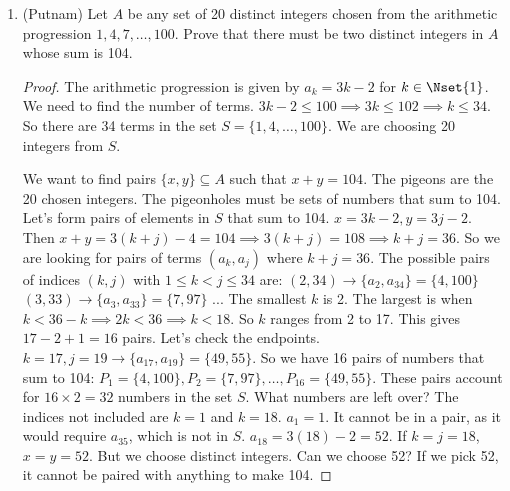 \begin{enumerate}
\begin{proof}
    Now we analyze this collision. Consider the sequence elements $a_j$ and $a_k$ with $j < k$.
    Case 1: $a_j < a_k$. Since $a_k$ comes after $a_j$ and is larger, we can form an increasing subsequence ending at $a_k$ by taking the longest increasing subsequence that ends at $a_j$ (which has length $i_j = i^*$) and appending $a_k$. The new length would be $i_j+1 = i^*+1$. But we know the longest increasing subsequence ending at $a_k$ has length $i_k=i^*$. This is a contradiction, as we have found a longer one.
    Case 2: $a_j > a_k$. Similarly, since $a_k$ comes after $a_j$ and is smaller, we can form a decreasing subsequence ending at $a_k$ by taking the longest decreasing subsequence ending at $a_j$ (of length $d_j=d^*$) and appending $a_k$. The new length is $d_j+1=d^*+1$. This contradicts the fact that the longest such sequence has length $d_k=d^*$.
    
    Since $a_j$ and $a_k$ are distinct, one of these two cases must hold. Both lead to a contradiction. Therefore, our initial assumption that no monotonic subsequence of length $n+1$ exists must be false.
    \end{proof}
    
    \item {} (Putnam) Let $A$ be any set of 20 distinct integers chosen from the arithmetic progression $1, 4, 7, \dots, 100$. Prove that there must be two distinct integers in $A$ whose sum is 104.
    \begin{proof}
    The arithmetic progression is given by $a_k = 3k-2$ for $k \in \Nset{1}$. We need to find the number of terms. $3k-2 \le 100 \implies 3k \le 102 \implies k \le 34$. So there are 34 terms in the set $S = \{1, 4, \dots, 100\}$. We are choosing 20 integers from $S$.

    We want to find pairs $\{x,y\} \subseteq A$ such that $x+y=104$. The pigeons are the 20 chosen integers. The pigeonholes must be sets of numbers that sum to 104.
    Let's form pairs of elements in $S$ that sum to 104.
    $x=3k-2, y=3j-2$. Then $x+y = 3(k+j)-4 = 104 \implies 3(k+j)=108 \implies k+j=36$.
    So we are looking for pairs of terms $(a_k, a_j)$ where $k+j=36$.
    The possible pairs of indices $(k,j)$ with $1 \le k < j \le 34$ are:
    $(2,34) \to \{a_2, a_{34}\} = \{4, 100\}$
    $(3,33) \to \{a_3, a_{33}\} = \{7, 97\}$
    ...
    The smallest $k$ is 2. The largest is when $k < 36-k \implies 2k < 36 \implies k < 18$.
    So $k$ ranges from 2 to 17. This gives $17-2+1=16$ pairs.
    Let's check the endpoints. $k=17, j=19 \to \{a_{17}, a_{19}\} = \{49, 55\}$.
    So we have 16 pairs of numbers that sum to 104:
    $P_1 = \{4, 100\}, P_2 = \{7, 97\}, \dots, P_{16}=\{49, 55\}$.
    These pairs account for $16 \times 2 = 32$ numbers in the set $S$.
    What numbers are left over? The indices not included are $k=1$ and $k=18$.
    $a_1 = 1$. It cannot be in a pair, as it would require $a_{35}$, which is not in $S$.
    $a_{18} = 3(18)-2 = 52$. If $k=j=18$, $x=y=52$. But we choose distinct integers. Can we choose 52? If we pick 52, it cannot be paired with anything to make 104.
    

\end{proof}
\end{enumerate}
